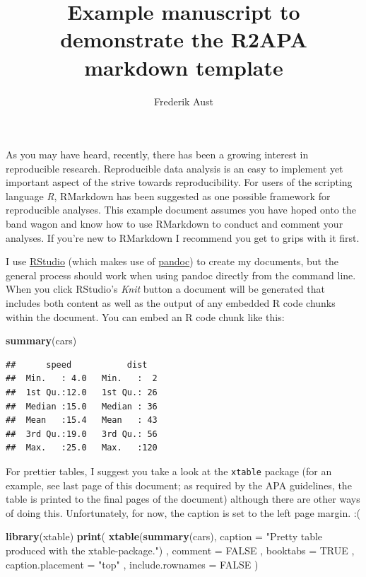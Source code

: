 \documentclass[american,man]{apa6}
\title{Example manuscript to demonstrate the R2APA markdown template}
\author{Frederik Aust}
\affiliation{University of Cologne}
\newenvironment{Shaded}{\begin{snugshade}}{\end{snugshade}}
\newcommand{\KeywordTok}[1]{\textcolor[rgb]{0.13,0.29,0.53}{\textbf{{#1}}}}
\newcommand{\DataTypeTok}[1]{\textcolor[rgb]{0.13,0.29,0.53}{{#1}}}
\newcommand{\StringTok}[1]{\textcolor[rgb]{0.31,0.60,0.02}{{#1}}}
\newcommand{\OtherTok}[1]{\textcolor[rgb]{0.56,0.35,0.01}{{#1}}}
\newcommand{\NormalTok}[1]{{#1}}
\begin{document}
\maketitle

As you may have heard, recently, there has been a growing interest in
reproducible research. Reproducible data analysis is an easy to
implement yet important aspect of the strive towards reproducibility.
For users of the scripting language \emph{R}, RMarkdown has been
suggested as one possible framework for reproducible analyses. This
example document assumes you have hoped onto the band wagon and know how
to use RMarkdown to conduct and comment your analyses. If you're new to
RMarkdown I recommend you get to grips with it first.

I use \href{http://www.rstudio.com/}{RStudio} (which makes use of
\href{http://johnmacfarlane.net/pandoc/}{pandoc}) to create my
documents, but the general process should work when using pandoc
directly from the command line. When you click RStudio's \emph{Knit}
button a document will be generated that includes both content as well
as the output of any embedded R code chunks within the document. You can
embed an R code chunk like this:

\begin{Shaded}
\begin{Highlighting}[]
\KeywordTok{summary}\NormalTok{(cars)}
\end{Highlighting}
\end{Shaded}

\begin{verbatim}
##      speed           dist    
##  Min.   : 4.0   Min.   :  2  
##  1st Qu.:12.0   1st Qu.: 26  
##  Median :15.0   Median : 36  
##  Mean   :15.4   Mean   : 43  
##  3rd Qu.:19.0   3rd Qu.: 56  
##  Max.   :25.0   Max.   :120
\end{verbatim}

For prettier tables, I suggest you take a look at the \texttt{xtable}
package (for an example, see last page of this document; as required by
the APA guidelines, the table is printed to the final pages of the
document) although there are other ways of doing this. Unfortunately,
for now, the caption is set to the left page margin. :(

\begin{Shaded}
\begin{Highlighting}[]
\KeywordTok{library}\NormalTok{(xtable)}
\KeywordTok{print}\NormalTok{(}
  \KeywordTok{xtable}\NormalTok{(}\KeywordTok{summary}\NormalTok{(cars), }\DataTypeTok{caption =} \StringTok{"Pretty table produced with the xtable-package."}\NormalTok{)}
  \NormalTok{, }\DataTypeTok{comment =} \OtherTok{FALSE}
  \NormalTok{, }\DataTypeTok{booktabs =} \OtherTok{TRUE}
  \NormalTok{, }\DataTypeTok{caption.placement =} \StringTok{"top"}
  \NormalTok{, }\DataTypeTok{include.rownames =} \OtherTok{FALSE}
\NormalTok{)}
\end{Highlighting}
\end{Shaded}
\end{document}
